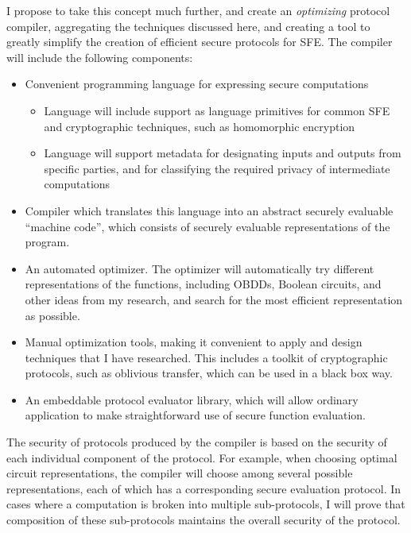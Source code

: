 I propose to take this concept much further, and create an \emph{optimizing}
protocol compiler, aggregating the techniques discussed here, and
creating a tool to greatly simplify the creation of efficient secure
protocols for SFE. The compiler will include the following components:
\begin{itemize}
\item Convenient programming language for expressing secure computations

\begin{itemize}
\item Language will include support as language primitives for common SFE
and cryptographic techniques, such as homomorphic encryption
\item Language will support metadata for designating inputs and outputs
from specific parties, and for classifying the required privacy of
intermediate computations
\end{itemize}
\item Compiler which translates this language into an abstract securely
evaluable {}``machine code'', which consists of securely evaluable
representations of the program.
\item An automated optimizer. The optimizer will automatically try different
representations of the functions, including OBDDs, Boolean circuits,
and other ideas from my research, and search for the most efficient
representation as possible.
\item Manual optimization tools, making it convenient to apply and design
techniques that I have researched. This includes a toolkit of cryptographic
protocols, such as oblivious transfer, which can be used in a black
box way.
\item An embeddable protocol evaluator library, which will allow ordinary
application to make straightforward use of secure function evaluation.
\end{itemize}
The security of protocols produced by the compiler is based on the
security of each individual component of the protocol. For example,
when choosing optimal circuit representations, the compiler will choose
among several possible representations, each of which has a corresponding
secure evaluation protocol. In cases where a computation is broken
into multiple sub-protocols, I will prove that composition of these
sub-protocols maintains the overall security of the protocol.

%

{}
